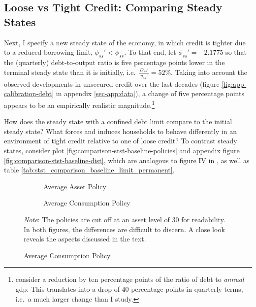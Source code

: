 \documentclass[a4paper,12pt]{article} %
\numberwithin{equation}{section} %
\numberwithin{figure}{section}
\numberwithin{table}{section}
\begin{document}
\subsection{Loose vs Tight Credit: Comparing Steady States}
\label{sec:limit-stst-tight}

Next, I specify a new steady state of the economy, in which credit is tighter due to a reduced borrowing limit, $\phi_{ss}' < \phi_{ss}$. To that end, let $\phi_{ss}' = -2.1775$ so that the (quarterly) debt-to-output ratio is five percentage points lower in the terminal steady state than it is initially, i.e.~$\frac{D_{ss}'}{y_{ss}'} = 52\%$. Taking into account the observed developments in unsecured credit over the last decades (figure \ref{fig:app-calibration-debt} in appendix \ref{sec-app:data}), a change of five percentage points appears to be an empirically realistic magnitude.\footnote{\textcite{gl2017} consider a reduction by ten percentage points of the ratio of debt to \textit{annual} \Gls{gdp}. This translates into a drop of $40$ percentage points in quarterly terms, i.e.~a much larger change than I study.} 

How does the steady state with a confined debt limit compare to the initial steady state? What forces and induces households to behave differently in an environment of tight credit relative to one of loose credit? To contrast steady states, consider plot \ref{fig:comparison-stst-baseline-policies} and appendix figure \ref{fig:comparison-stst-baseline-dist}, which are analogous to figure IV in \textcite[p.1443]{gl2017}, as well as table \ref{tab:stst_comparison_baseline_limit_permanent}. 

\begin{figure}[t]
    \caption{Baseline Model -- Shock to Borrowing Limit: Household Policies}
    \label{fig:comparison-stst-baseline-policies}
    \centering
    \begin{subfigure}[b]{0.49\textwidth}
    \caption{Average Asset Policy}
    \label{fig:comparison-stst-baseline-policies-a}
         \centering
         
     \end{subfigure}
     \hfill
     \begin{subfigure}[b]{0.49\textwidth}
     \caption{Average Consumption Policy}
     \label{fig:comparison-stst-baseline-policies-c}
         \centering
         
     \end{subfigure}

    \vspace{10pt}
     
     \justifying
     \footnotesize
	\textit{Note}: The policies are cut off at an asset level of $30$ for readability. In both figures, the differences are difficult to discern. A close look reveals the aspects discussed in the text.
\end{figure}
\end{document}
